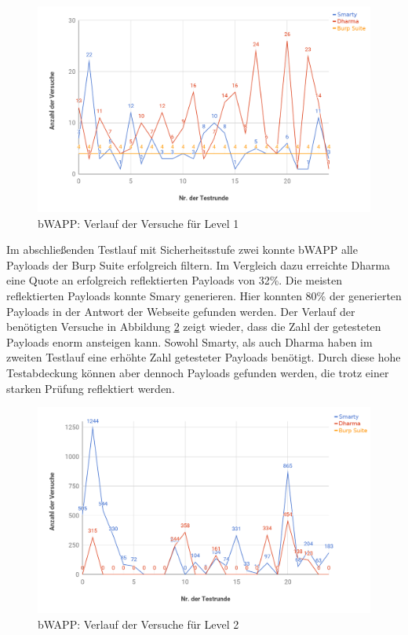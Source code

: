 \begin{figure}[htbp] 
	\centering
	\includegraphics[width=\textwidth]{contents/images/bWAPPLvl1ReflectedTries}
	\caption{bWAPP: Verlauf der Versuche für Level 1}
	\label{fig:bWAPPLvl1ReflectedTries}
\end{figure}

Im abschließenden Testlauf mit Sicherheitsstufe zwei konnte bWAPP alle Payloads der Burp Suite erfolgreich filtern. Im Vergleich dazu erreichte Dharma eine Quote an erfolgreich reflektierten Payloads von 32\%. Die meisten reflektierten Payloads konnte Smary generieren. Hier konnten 80\% der generierten Payloads in der Antwort der Webseite gefunden werden. Der Verlauf der benötigten Versuche in Abbildung \ref{fig:bWAPPLvl2ReflectedTries} zeigt wieder, dass die Zahl der getesteten Payloads enorm ansteigen kann. Sowohl Smarty, als auch Dharma haben im zweiten Testlauf eine erhöhte Zahl getesteter Payloads benötigt. Durch diese hohe Testabdeckung können aber dennoch Payloads gefunden werden, die trotz einer starken Prüfung reflektiert werden.


\begin{figure}[htbp] 
	\centering
	\includegraphics[width=\textwidth]{contents/images/bWAPPLvl2ReflectedTries}
	\caption{bWAPP: Verlauf der Versuche für Level 2}
	\label{fig:bWAPPLvl2ReflectedTries}
\end{figure}

